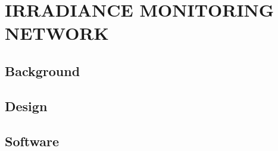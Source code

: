 \chapter{IRRADIANCE MONITORING NETWORK}
\label{chap:sens_net}

\section{Background}

\section{Design}

\section{Software}

